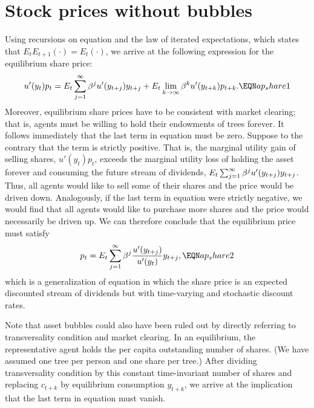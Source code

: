 \section{Stock prices without bubbles}

Using recursions on equation
  and the law of iterated expectations,
which states that $E_tE_{t+1}(\cdot) =E_t(\cdot)$,
we arrive at the following expression for the equilibrium share price:
$$
u'(y_t) p_t = E_t \sum_{j=1}^\infty \be^j u'(y_{t+j}) y_{t+j}
            + E_t \lim_{k\to\infty} \beta^k u'(y_{t+k})p_{t+k}.  \EQN ap_share1
$$
Moreover, equilibrium share prices have to be consistent with
market clearing; that is, agents must be willing to hold their endowments
of trees forever. It follows immediately that the last term in equation
 must be zero. Suppose to the contrary that the term is strictly
positive. That is, the marginal utility gain of selling shares, $u'(y_t) p_t$,
exceeds the marginal utility loss of
holding the asset forever and consuming the future stream of dividends,
$E_t \sum_{j=1}^\infty {\beta}^j u'(y_{t+j}) y_{t+j}$. Thus, all agents
would like to sell some of their shares and the price would be driven
down. Analogously, if the last term in equation
  were strictly negative,
we would find that all agents would like to purchase more shares and the
price would necessarily be driven up. We can therefore conclude that the
equilibrium price must satisfy
$$
p_t = E_t \sum_{j=1}^\infty \be^j {u'(y_{t+j})\over u'(y_t)} y_{t+j},
                                                                  \EQN ap_share2
$$
which is a generalization of equation
  in which the share price is an expected
discounted stream of dividends but with time-varying and stochastic discount
rates.

Note that asset bubbles could also have been ruled out by directly
referring to transversality condition  and market clearing. In an
equilibrium, the representative agent holds the per capita
outstanding number of shares.
 (We have assumed one tree per person and one share per tree.)
After dividing transversality condition  by this constant
time-invariant number of shares and replacing $c_{t+k}$ by equilibrium
consumption $y_{t+k}$, we arrive at the implication that the last
term in equation
 must vanish.
       
   

